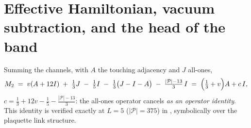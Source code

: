 \documentclass[11pt]{article}
\begin{document}
\section{Effective Hamiltonian, vacuum subtraction, and the head of the band}
\label{sec:eff}
Summing the channels, with $A$ the touching adjacency and $J$ all-ones,
\begin{equation}\label{eq:M2}
M_2 \;=\; v(A+12I)\;+\;\tfrac13 J\;-\;\tfrac15 I\;-\;\tfrac13\bigl(J-I-A\bigr)
\;-\;\tfrac{|\mathcal P|-13}{3}\,I
\;=\;\Bigl(\tfrac13+v\Bigr)A+c\,I,
\end{equation}
$c=\tfrac13+12v-\tfrac15-\tfrac{|\mathcal P|-13}{3}$: the all-ones operator
cancels \emph{as an operator identity}. This identity is verified exactly at
$L=5$ ($|\mathcal P|=375$) in \cite{YM04code}, symbolically over the
plaquette link structure.
\end{document}
